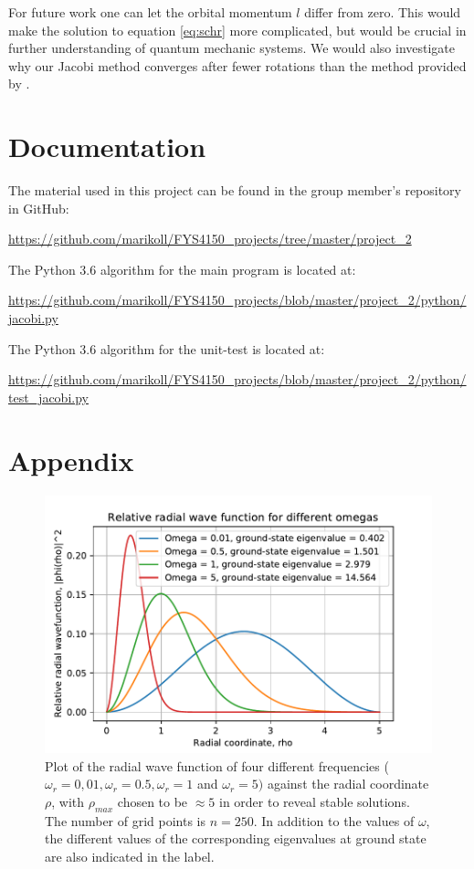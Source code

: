 \documentclass{article}
\begin{document}
\medskip

For future work one can let the orbital momentum $l$ differ from zero. This would make the solution to equation \ref{eq:schr} more complicated, but would be crucial in further understanding of quantum mechanic systems. We would also investigate why our Jacobi method converges after fewer rotations than the method provided by \cite{CompPhys}.

\medskip


\section{Documentation}

The material used in this project can be found in the group member's repository in GitHub:

\url{https://github.com/marikoll/FYS4150_projects/tree/master/project_2}

The Python 3.6 algorithm for the main program is located at: 

\url{https://github.com/marikoll/FYS4150_projects/blob/master/project_2/python/jacobi.py}

The Python 3.6 algorithm for the unit-test is located at: 

\url{https://github.com/marikoll/FYS4150_projects/blob/master/project_2/python/test_jacobi.py}

\newpage

 

\newpage
\appendix
\section{Appendix}

\label{appendix}


\begin{figure}[!H]
    \centering
    \includegraphics[width =\linewidth]{solutions.pdf}
    \caption{Plot of the radial wave function of four different frequencies ($\omega_r = 0,01,\omega_r = 0.5, \omega_r = 1$ and $\omega_r = 5)$ against the radial coordinate $\rho$, with $\rho_{max}$ chosen to be $\approx 5$ in order to reveal stable solutions. The number of grid points is $n = 250$. In addition to the values of $\omega$, the different values of the corresponding eigenvalues at ground state are also indicated in the label.}
    \label{fig:1}
\end{figure}
\end{document}
